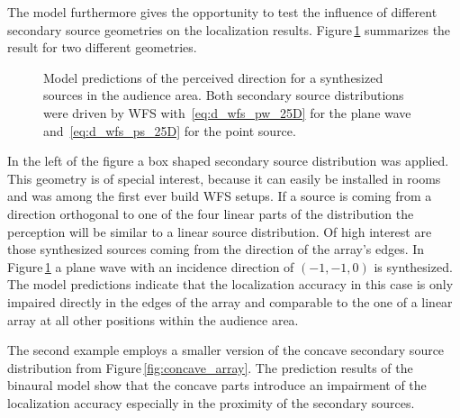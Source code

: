 The model furthermore gives the opportunity to test the influence of different
secondary source geometries on the localization results.
Figure\,\ref{fig:wfs_model} summarizes the result for two different geometries.
%
\begin{figure}
    \small
    \centering
    
    \caption{Model predictions of the perceived direction for a synthesized
    sources in the audience area. Both secondary source
    distributions were driven by \ac{WFS} with~\protect\eqref{eq:d_wfs_pw_25D} for the
    plane wave and~\protect\eqref{eq:d_wfs_ps_25D} for the point source.
    }
    \label{fig:wfs_model}
\end{figure}
%
In the left of the figure a box shaped secondary source distribution was applied.
This geometry is of special interest, because it can easily be installed in
rooms and was among the first ever build \ac{WFS}
setups.
If a source is coming from a direction orthogonal to one of the four linear
parts of the distribution the perception will be similar to a linear source
distribution. Of high interest are those synthesized sources coming from the direction
of the array's edges. In Figure\,\ref{fig:wfs_model} a plane wave with an
incidence direction of $(-1,-1,0)$ is synthesized. The model predictions
indicate
that the localization accuracy in this case is only impaired directly in the
edges of the array and comparable to the one of a linear array at all other
positions within the audience area.

The second example employs a smaller version of the concave secondary source
distribution from Figure\,\ref{fig:concave_array}.
The prediction results of the binaural model show that the
concave parts introduce an impairment of the localization
accuracy especially in the proximity of the secondary sources. 

